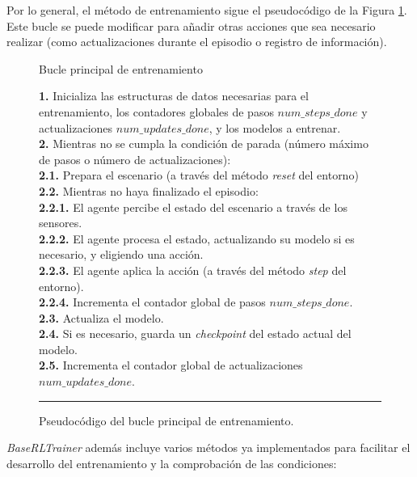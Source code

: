\begin{itemize}
	Por lo general, el método de entrenamiento sigue el pseudocódigo de la Figura \ref{alg:train}. Este bucle se puede modificar para añadir otras acciones que sea necesario realizar (como actualizaciones durante el episodio o registro de información).
	
	\begin{figure}[h]
\begin{algorithm}[H]
\caption{Bucle principal de entrenamiento}
\textbf{1.} Inicializa las estructuras de datos necesarias para el entrenamiento, los contadores globales de pasos $num\_steps\_done$ y actualizaciones $num\_updates\_done$, y los modelos a entrenar.\\
\textbf{2.} Mientras no se cumpla la condición de parada (número máximo de pasos o número de actualizaciones):\\
\Indp \textbf{2.1.} Prepara el escenario (a través del método \textit{reset} del entorno)\\
\textbf{2.2.} Mientras no haya finalizado el episodio:\\
\Indp \textbf{2.2.1.} El agente percibe el estado del escenario a través de los sensores.\\
\textbf{2.2.2.} El agente procesa el estado, actualizando su modelo si es necesario, y eligiendo una acción.\\
\textbf{2.2.3.} El agente aplica la acción (a través del método \textit{step} del entorno).\\
\textbf{2.2.4.} Incrementa el contador global de pasos $num\_steps\_done$.\\
\Indm \textbf{2.3.} Actualiza el modelo.\\
\textbf{2.4.} Si es necesario, guarda un \textit{checkpoint} del estado actual del modelo.\\
\textbf{2.5.} Incrementa el contador global de actualizaciones $num\_updates\_done$.
\end{algorithm}
\hrule
\caption{Pseudocódigo del bucle principal de entrenamiento.}
\label{alg:train}
\end{figure}
\end{itemize}


\textit{BaseRLTrainer} además incluye varios métodos ya implementados para facilitar el desarrollo del entrenamiento y la comprobación de las condiciones:

